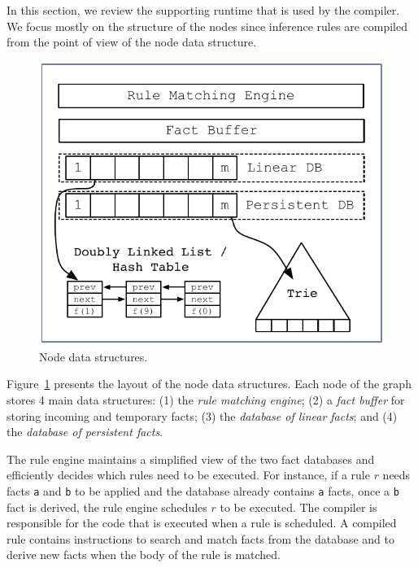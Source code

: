 In this section, we review the supporting runtime that is used by the compiler.
We focus mostly on the structure of the nodes since inference rules are compiled
from the point of view of the node data structure.

\begin{figure}
\begin{center}
   \includegraphics[width=1\linewidth]{figures/overview.pdf}
\end{center}
\caption{Node data structures.}
\label{fig:node}
\end{figure}

Figure~\ref{fig:node} presents the layout of the node data structures.  Each
node of the graph stores 4 main data structures: (1) the \emph{rule matching
   engine}; (2) a \emph{fact buffer} for storing incoming and temporary facts;
(3) the \emph{database of linear facts}; and (4) the \emph{database of
   persistent facts}.

The rule engine maintains a simplified view of the two fact databases and
efficiently decides which rules need to be executed. For instance, if a rule $r$
needs facts \texttt{a} and \texttt{b} to be applied and the database already
contains \texttt{a} facts, once a \texttt{b} fact is derived, the rule engine
schedules $r$ to be executed. The compiler is responsible for the code that is
executed when a rule is scheduled.  A compiled rule contains instructions to
search and match facts from the database and to derive new facts when the body
of the rule is matched.

